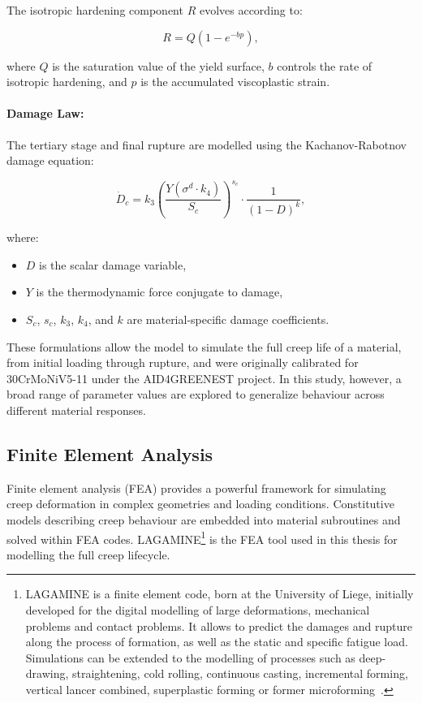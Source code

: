 \documentclass[class=scrbook, crop=false]{standalone}
\begin{document}
The isotropic hardening component $R$ evolves according to:

\begin{equation}
	R = Q \left(1 - e^{-b p}\right),
\end{equation}

where $Q$ is the saturation value of the yield surface, $b$ controls the rate of isotropic hardening, and $p$ is the accumulated viscoplastic strain.

\paragraph{Damage Law:} The tertiary stage and final rupture are modelled using the Kachanov-Rabotnov damage equation:

\begin{equation}
	\dot{D}_c = k_3 \left( \frac{Y (\sigma^d \cdot k_4)}{S_c} \right)^{s_c} \cdot \frac{1}{(1 - D)^k},
\end{equation}

where:
\begin{itemize}
	\item $D$ is the scalar damage variable,
	\item $Y$ is the thermodynamic force conjugate to damage,
	\item $S_c$, $s_c$, $k_3$, $k_4$, and $k$ are material-specific damage coefficients.
\end{itemize}

These formulations allow the model to simulate the full creep life of a material, from initial loading through rupture, and were originally calibrated for 30CrMoNiV5-11 under the AID4GREENEST project. In this study, however, a broad range of parameter values are explored to generalize behaviour across different material responses.

\subsection{Finite Element Analysis}

Finite element analysis (FEA) provides a powerful framework for simulating creep deformation in complex geometries and loading conditions. Constitutive models describing creep behaviour are embedded into material subroutines and solved within FEA codes. LAGAMINE\footnote{LAGAMINE is a finite element code, born at the University of Liege, initially developed for the digital modelling of large deformations, mechanical problems and contact problems. It allows to predict the damages and rupture along the process of formation, as well as the static and specific fatigue load. Simulations can be extended to the modelling of processes such as deep-drawing, straightening, cold rolling, continuous casting, incremental forming, vertical lancer combined, superplastic forming or former microforming~\cite{lagamine_uliege}.} is the FEA tool used in this thesis for modelling the full creep lifecycle.
\end{document}
